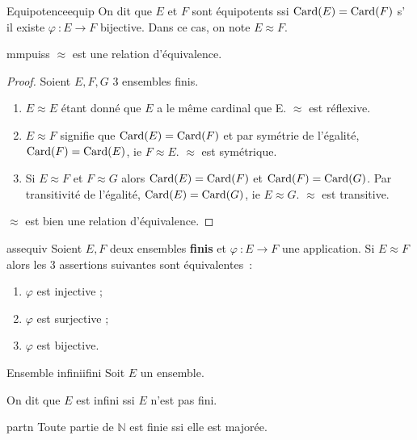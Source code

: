 \documentclass[a4paper,french,final]{memoir}
\begin{document}
\begin{defb}{Equipotence}{equip}
    On dit que $E$ et $F$ sont équipotents ssi $\operatorname{Card}(E) = \operatorname{Card}(F)$ s' il existe $\varphi~: E \to F$ bijective. Dans ce cas, on note $E \mathrel{\approx} F$. 
\end{defb}

\begin{theoremb}{}{mmpuiss}
    $ \mathrel{\approx}$ est une relation d'équivalence. 
\end{theoremb}

\begin{proof}
    Soient $E, F, G$ 3 ensembles finis.
	\begin{enumerate} 
		\item $E \mathrel{\approx} E$ étant donné que $E$ a le même cardinal que E. $\mathrel{\approx}$ est réflexive.
		\item $E \mathrel{\approx} F$ signifie que $ \operatorname{Card}(E) = \operatorname{Card}(F)$ et par symétrie de l'égalité, $\operatorname{Card}(F) = \operatorname{Card}(E)$, ie $F \mathrel{\approx} E$. $\mathrel{\approx}$ est symétrique. 
		\item Si $E \mathrel{\approx} F$ et $F \mathrel{\approx} G$ alors $\operatorname{Card}(E) = \operatorname{Card}(F)$ et $\operatorname{Card}(F) = \operatorname{Card}(G)$. Par transitivité de l'égalité, $\operatorname{Card}(E) = \operatorname{Card}(G)$, ie $E \mathrel{\approx} G$. $\mathrel{\approx}$ est transitive. 
	\end{enumerate}
	$\mathrel{\approx}$ est bien une relation d'équivalence.
\end{proof}

\begin{theoremb}{}{assequiv}
	Soient $E, F$ deux ensembles \textbf{finis} et $\varphi~: E \to F$ une application. Si $E \mathrel{\approx} F$ alors les 3 assertions suivantes sont équivalentes~:
	
	\begin{enumerate}
		\item $\varphi$ est injective ;
		\item $\varphi$ est surjective ;
		\item $\varphi$ est bijective. 
	\end{enumerate}
\end{theoremb}

\begin{defb}{Ensemble infini}{ifini}
	Soit $E$ un ensemble.
	
	On dit que $E$ est infini ssi $E$ n'est pas fini.
\end{defb}

\begin{theoremb}{}{partn} 
	Toute partie de $\mathbb{N}$ est finie ssi elle est majorée. 
\end{theoremb}
\end{document}
